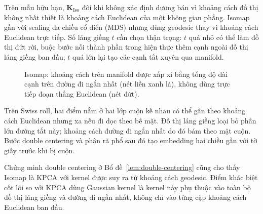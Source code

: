Trên mẫu hữu hạn, $\mathbf{K}_{\mathrm{Iso}}$ đôi khi không xác định dương bán vì khoảng cách đồ thị không nhất thiết là khoảng cách Euclidean của một không gian phẳng. Isomap gần với scaling đa chiều cổ điển (MDS) nhưng dùng geodesic thay vì khoảng cách Euclidean trực tiếp. Số láng giềng $t$ cần chọn thận trọng: $t$ quá nhỏ có thể làm đồ thị đứt rời, buộc bước nối thành phần trong hiện thực thêm cạnh ngoài đồ thị láng giềng ban đầu; $t$ quá lớn lại tạo các cạnh tắt xuyên qua manifold.

\begin{figure}[H]
\centering
{}
\caption{Isomap: khoảng cách trên manifold được xấp xỉ bằng tổng độ dài cạnh trên đường đi ngắn nhất (nét liền xanh lá), không dùng trực tiếp đoạn thẳng Euclidean (nét đứt).}
\label{fig:isomap-graph}
\end{figure}

\begin{example}
Trên Swiss roll, hai điểm nằm ở hai lớp cuộn kế nhau có thể gần theo khoảng cách Euclidean nhưng xa nếu đi dọc theo bề mặt. Đồ thị láng giềng loại bỏ phần lớn đường tắt này; khoảng cách đường đi ngắn nhất do đó bám theo mặt cuộn. Bước double centering và phân rã phổ sau đó tạo embedding hai chiều gần với tờ giấy trước khi bị cuộn.
\end{example}

\begin{extension}
Chứng minh double centering ở Bổ đề~\ref{lem:double-centering} cũng cho thấy Isomap là KPCA với kernel được suy ra từ khoảng cách geodesic. Điểm khác biệt cốt lõi so với KPCA dùng Gaussian kernel là kernel này phụ thuộc vào toàn bộ đồ thị láng giềng và đường đi ngắn nhất, không chỉ vào từng cặp khoảng cách Euclidean ban đầu.
\end{extension}

